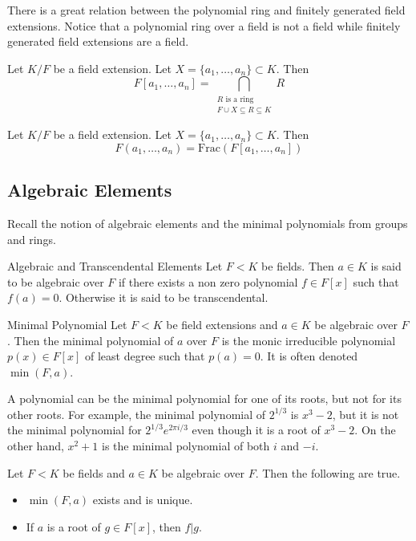 \documentclass[a4paper]{article}
\begin{document}
There is a great relation between the polynomial ring and finitely generated field extensions. Notice that a polynomial ring over a field is not a field while finitely generated field extensions are a field. 

\begin{prp}{}{} Let $K/F$ be a field extension. Let $X=\{a_1,\dots,a_n\}\subset K$. Then $$F[a_1,\dots,a_n]=\bigcap_{\substack{R\text{ is a ring}\\F\cup X\subseteq R\subseteq K}}R$$
\end{prp}

\begin{prp}{}{} Let $K/F$ be a field extension. Let $X=\{a_1,\dots,a_n\}\subset K$. Then $$F(a_1,\dots,a_n)=\text{Frac}\left(F[a_1,\dots,a_n]\right)$$
\end{prp}

\subsection{Algebraic Elements}
Recall the notion of algebraic elements and the minimal polynomials from groups and rings. 

\begin{defn}{Algebraic and Transcendental Elements}{} Let $F<K$ be fields. Then $a\in K$ is said to be algebraic over $F$ if there exists a non zero polynomial $f\in F[x]$ such that $f(a)=0$. Otherwise it is said to be transcendental. 
\end{defn}

\begin{defn}{Minimal Polynomial}{} Let $F<K$ be field extensions and $a\in K$ be algebraic over $F$. Then the minimal polynomial of $a$ over $F$ is the monic irreducible polynomial $p(x)\in F[x]$ of least degree such that $p(a)=0$. It is often denoted $\min(F,a)$. 
\end{defn}

A polynomial can be the minimal polynomial for one of its roots, but not for its other roots. For example, the minimal polynomial of $2^{1/3}$ is $x^3-2$, but it is not the minimal polynomial for $2^{1/3}e^{2\pi i/3}$ even though it is a root of $x^3-2$. On the other hand, $x^2+1$ is the minimal polynomial of both $i$ and $-i$. 

\begin{prp}{}{} Let $F<K$ be fields and $a\in K$ be algebraic over $F$. Then the following are true. 
\begin{itemize}
\item $\min(F,a)$ exists and is unique. 
\item If $a$ is a root of $g\in F[x]$, then $f|g$. 
\end{itemize}
\end{prp}
\end{document}
